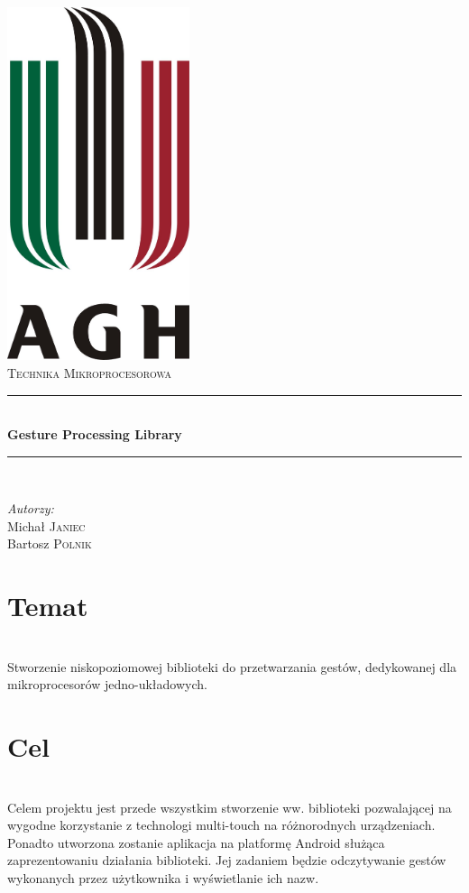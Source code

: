 \documentclass[a4paper,12pt]{article}
\newcommand{\HRule}{\rule{\linewidth}{0.5mm}}
\begin{document}
\begin{titlepage}
	\begin{center}
		\includegraphics[width=0.4\textwidth]{../data/logo} \\[1cm]
		\textsc{\LARGE Technika Mikroprocesorowa} \\[0.8cm]
		\HRule \\[0.4cm]
		{ \huge \bfseries Gesture Processing Library} \\[0.4cm]
		\HRule \\[1.5cm]
	\end{center}
	\begin{minipage}{0.4\textwidth}
		\begin{flushleft} \large
		\emph{Autorzy:} \\
		Michał \textsc{Janiec} \\
		Bartosz \textsc{Polnik}
		\end{flushleft}
	\end{minipage}
\end{titlepage}
\thispagestyle{empty}

\tableofcontents

\section{Temat} \ \\[0.1cm]
\indent Stworzenie niskopoziomowej biblioteki do przetwarzania gestów, dedykowanej dla mikroprocesorów jedno-układowych.

\section{Cel} \ \\[0.1cm]
\indent Celem projektu jest przede wszystkim stworzenie ww. biblioteki pozwalającej na wygodne korzystanie z technologi multi-touch na różnorodnych urządzeniach. Ponadto utworzona zostanie aplikacja na platformę Android służąca zaprezentowaniu działania biblioteki. Jej zadaniem będzie odczytywanie gestów wykonanych przez użytkownika i wyświetlanie ich nazw.
\end{document}
